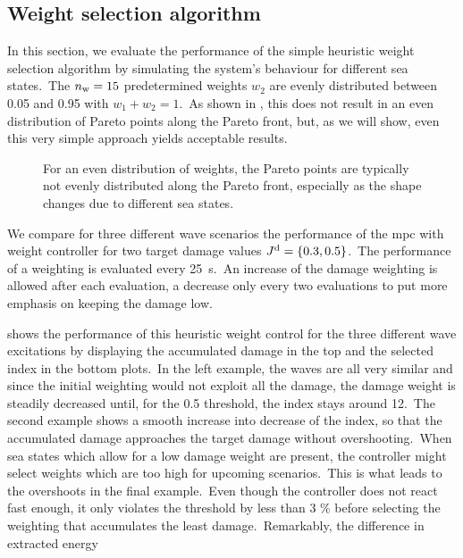 \subsection{Weight selection algorithm}
In this section, we evaluate the performance of the simple heuristic weight selection algorithm by simulating the system's behaviour for different sea states.\ 
The $n_\mathrm{w}=15$ predetermined weights $w_2$ are evenly distributed between 0.05 and 0.95 with $w_1+w_2=1$.\ 
As shown in , this does not result in an even distribution of Pareto points along the Pareto front, but, as we will show, even this very simple approach yields acceptable results.\
\begin{figure}[htb]
	\centering
	\fontsize{8}{0}\selectfont
	\def\svgwidth{0.4\textwidth}
	
	\caption{For an even distribution of weights, the Pareto points are typically not evenly distributed along the Pareto front, especially as the shape changes due to different sea states.}
	\label{fig:PF}
\end{figure}

We compare for three different wave scenarios the performance of the \ac{mpc} with weight controller for two target damage values $J^\mathrm{d} = \left\{0.3, 0.5\right\}$.\ 
The performance of a weighting is evaluated every \SI{25}{\second}.\ 
An increase of the damage weighting is allowed after each evaluation, a decrease only every two evaluations to put more emphasis on keeping the damage low.


\figref{fig:weight_control} shows the performance of this heuristic weight control for the three different wave excitations by displaying the accumulated damage in the top and the selected index in the bottom plots.\ 
In the left example, the waves are all very similar and since the initial weighting would not exploit all the damage, the damage weight is steadily decreased until, for the 0.5 threshold, the index stays around 12.\
The second example shows a smooth increase into decrease of the index, so that the accumulated damage approaches the target damage without overshooting.\ 
When sea states which allow for a low damage weight are present, the controller might select weights which are too high for upcoming scenarios.\ 
This is what leads to the overshoots in the final example.\ 
Even though the controller does not react fast enough, it only violates the threshold by less than 3 \% before selecting the weighting that accumulates the least damage.\ 
Remarkably, the difference in extracted energy

